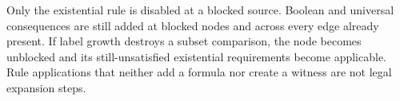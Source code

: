 Only the existential rule is disabled at a blocked source.  Boolean and
universal consequences are still added at blocked nodes and across every edge
already present.  If label growth destroys a subset comparison, the node
becomes unblocked and its still-unsatisfied existential requirements become
applicable.  Rule applications that neither add a formula nor create a witness
are not legal expansion steps.
